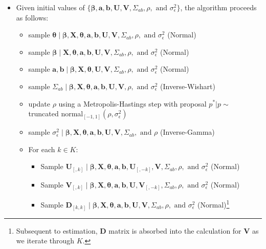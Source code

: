 \documentclass[12pt,pdflatex]{elsarticle}
\begin{document}
\begin{itemize}
 \item Given initial values of $\{\bm\beta, \textbf{a}, \textbf{b}, \textbf{U}, \textbf{V}, \Sigma_{ab}, \rho, \text{ and } \sigma_{\epsilon}^{2}\}$, the algorithm proceeds as follows:
 \begin{itemize}
 	\item sample $\bm\theta \; | \;  \bm\beta, \textbf{X}, \bm\theta, \textbf{a}, \textbf{b}, \textbf{U}, \textbf{V}, \Sigma_{ab}, \rho, \text{ and } \sigma_{\epsilon}^{2}$ (Normal)
 	\item sample $\bm\beta \; | \;  \textbf{X}, \bm\theta, \textbf{a}, \textbf{b}, \textbf{U}, \textbf{V}, \Sigma_{ab}, \rho, \text{ and } \sigma_{\epsilon}^{2}$ (Normal)
 	\item sample $\textbf{a}, \textbf{b} \; | \; \bm\beta, \textbf{X}, \bm\theta, \textbf{U}, \textbf{V}, \Sigma_{ab}, \rho, \text{ and } \sigma_{\epsilon}^{2}$ (Normal)
	\item sample $\Sigma_{ab} \; | \; \bm\beta, \textbf{X}, \bm\theta, \textbf{a}, \textbf{b}, \textbf{U}, \textbf{V}, \rho, \text{ and } \sigma_{\epsilon}^{2}$ (Inverse-Wishart)
 	\item update $\rho$ using a Metropolis-Hastings step with proposal $p^{*} | p  \sim$ truncated normal$_{[-1,1]}(\rho, \sigma_{\epsilon}^{2})$
 	\item sample $\sigma_{\epsilon}^{2} \; | \; \bm\beta, \textbf{X}, \bm\theta, \textbf{a}, \textbf{b}, \textbf{U}, \textbf{V}, \Sigma_{ab}, \text{ and } \rho$ (Inverse-Gamma)
 	\item For each $k \in K$:
 	\begin{itemize}
 		\item Sample $\textbf{U}_{[,k]} \; | \; \bm\beta, \textbf{X}, \bm\theta, \textbf{a}, \textbf{b}, \textbf{U}_{[,-k]}, \textbf{V}, \Sigma_{ab}, \rho, \text{ and } \sigma_{\epsilon}^{2}$ (Normal)
 		\item Sample $\textbf{V}_{[,k]} \; | \; \bm\beta, \textbf{X}, \bm\theta, \textbf{a}, \textbf{b}, \textbf{U}, \textbf{V}_{[,-k]}, \Sigma_{ab}, \rho, \text{ and } \sigma_{\epsilon}^{2}$ (Normal)
 		\item Sample $\textbf{D}_{[k,k]}  \; | \; \bm\beta, \textbf{X}, \bm\theta, \textbf{a}, \textbf{b}, \textbf{U}, \textbf{V}, \Sigma_{ab}, \rho, \text{ and } \sigma_{\epsilon}^{2}$ (Normal)\footnote{Subsequent to estimation, \textbf{D} matrix is absorbed into the calculation for $\textbf{V}$ as we iterate through $K$. }
 	\end{itemize}
 \end{itemize}
\end{itemize}
\end{document}
